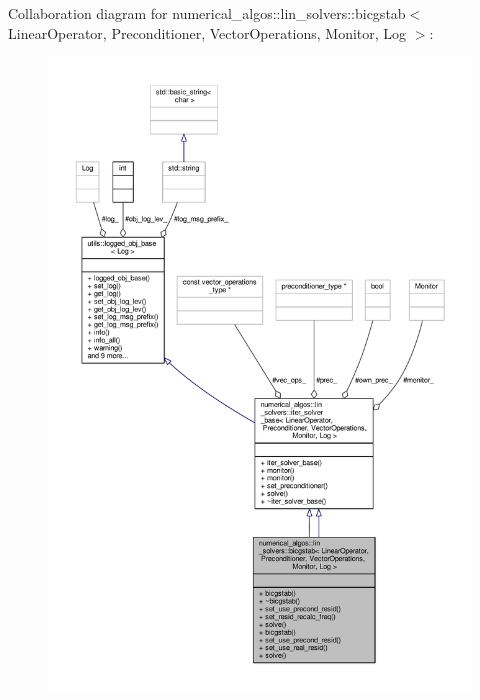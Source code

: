 Collaboration diagram for numerical\-\_\-algos\-:\-:lin\-\_\-solvers\-:\-:bicgstab$<$ Linear\-Operator, Preconditioner, Vector\-Operations, Monitor, Log $>$\-:\nopagebreak
\begin{figure}[H]
\begin{center}
\leavevmode
\includegraphics[width=350pt]{classnumerical__algos_1_1lin__solvers_1_1bicgstab__coll__graph}
\end{center}
\end{figure}
